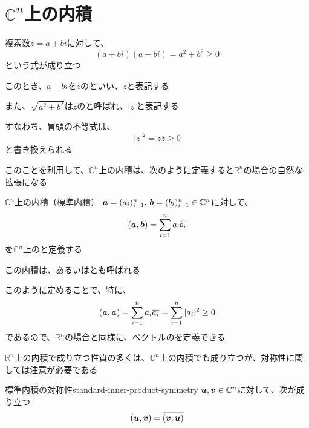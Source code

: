 \documentclass[../../../topic_linear-algebra]{subfiles}
\begin{document}
\sectionline
\section{$\mathbb{C}^n$上の内積}

複素数$z=a+bi$に対して、
\begin{equation*}
  (a+bi)(a-bi) = a^2 + b^2 \geq 0
\end{equation*}
という式が成り立つ

このとき、$a-bi$を$z$のといい、$\overline{z}$と表記する

また、$\sqrt{a^2 + b^2}$は$z$のと呼ばれ、$|z|$と表記する

\br

すなわち、冒頭の不等式は、
\begin{equation*}
  |z|^2 = z \overline{z} \geq 0
\end{equation*}
と書き換えられる

\br

このことを利用して、$\mathbb{C}^n$上の内積は、次のように定義すると$\mathbb{R}^n$の場合の自然な拡張になる

\begin{definition}{$\mathbb{C}^n$上の内積（標準内積）}\label{def:standard-inner-product-Cn}
  $\vb*{a} = (a_i)_{i=1}^n,\, \vb*{b} = (b_i)_{i=1}^n \in \mathbb{C}^n$に対して、
  \begin{equation*}
    (\vb*{a}, \vb*{b}) = \sum_{i=1}^n a_i \overline{b_i}
  \end{equation*}
  を$\mathbb{C}^n$上のと定義する

  この内積は、あるいはとも呼ばれる
\end{definition}

このように定めることで、特に、
\begin{equation*}
  (\vb*{a}, \vb*{a}) = \sum_{i=1}^n a_i \overline{a_i} = \sum_{i=1}^n |a_i|^2 \geq 0
\end{equation*}
であるので、$\mathbb{R}^n$の場合と同様に、ベクトルのを定義できる

\sectionline

$\mathbb{R}^n$上の内積で成り立つ性質の多くは、$\mathbb{C}^n$上の内積でも成り立つが、対称性に関しては注意が必要である

\begin{theorem}{標準内積の対称性}{standard-inner-product-symmetry}
  $\vb*{u}, \vb*{v} \in \mathbb{C}^n$に対して、次が成り立つ
  \begin{equation*}
    (\vb*{u}, \vb*{v}) = \overline{(\vb*{v}, \vb*{u})}
  \end{equation*}
\end{theorem}
\end{document}
